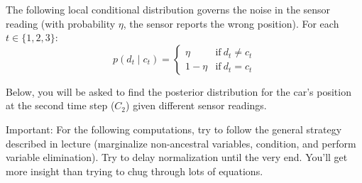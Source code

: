 \documentclass[10pt]{article}
\begin{document}
The following local conditional distribution governs the noise in the sensor reading (with probability $\eta$, the sensor reports the wrong position). For each $t \in \{1,2,3\}$:
$$p(d_t \mid c_t) = \begin{cases}
	\eta &\text{if} \ d_t \neq c_t\\
	1 - \eta &\text{if} \ d_t = c_t
\end{cases}$$

Below, you will be asked to find the posterior distribution for the car's position at the second time step ($C_2$) given different sensor readings.
\smallskip

Important: For the following computations, try to follow the general strategy described in lecture (marginalize non-ancestral variables, condition, and perform variable elimination). Try to delay normalization until the very end. You'll get more insight than trying to chug through lots of equations.
\end{document}
